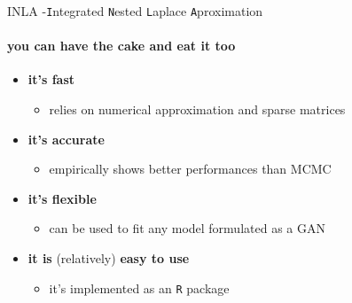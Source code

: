 \documentclass[9pt,ignorenonframetext,]{beamer}
\providecommand{\tightlist}{%
  \setlength{\itemsep}{0pt}\setlength{\parskip}{0pt}}
\begin{document}
\begin{frame}[fragile]{INLA -\texttt{I}ntegrated \texttt{N}ested
\texttt{L}aplace \texttt{A}proximation}
\protect\hypertarget{inla--integrated-nested-laplace-aproximation}{}

\framesubtitle{you can have the cake and eat it too}

\begin{itemize}
\tightlist
\item
  \textbf{it's fast}

  \begin{itemize}
  \tightlist
  \item
    relies on numerical approximation and sparse matrices
  \end{itemize}
\end{itemize}

\vspace{0.25cm}

\begin{itemize}
\tightlist
\item
  \textbf{it's accurate}

  \begin{itemize}
  \tightlist
  \item
    empirically shows better performances than MCMC
  \end{itemize}
\end{itemize}

\vspace{0.25cm}

\begin{itemize}
\tightlist
\item
  \textbf{it's flexible}

  \begin{itemize}
  \tightlist
  \item
    can be used to fit any model formulated as a GAN
  \end{itemize}
\end{itemize}

\vspace{0.25cm}

\begin{itemize}
\tightlist
\item
  \textbf{it is} (relatively) \textbf{easy to use}

  \begin{itemize}
  \tightlist
  \item
    it's implemented as an \texttt{R} package
  \end{itemize}
\end{itemize}

\end{frame}
\end{document}
